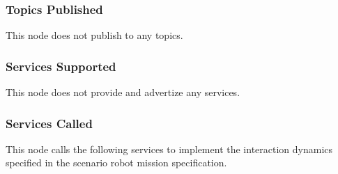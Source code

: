\documentclass{CSSRforAfrica}
\begin{document}
\subsubsection*{Topics Published}
This node does not publish to any  topics.


\subsubsection*{Services Supported}

This node does not provide and advertize  any services.

\subsubsection*{Services Called}
\label{section:robot_mission_interpreter_services_called}

This node  calls the following services to implement the interaction dynamics specified in the scenario robot mission specification.
\end{document}
